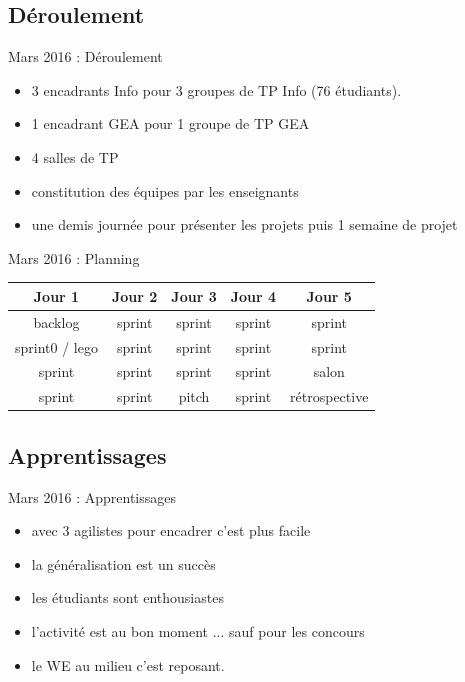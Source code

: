 \documentclass{beamer}
\begin{document}
\subsection{Déroulement}
\begin{frame}{Mars 2016 : Déroulement}
  \begin{itemize}
    \item 3 encadrants Info pour 3 groupes de TP Info (76 étudiants).
    \item 1 encadrant GEA pour 1 groupe de TP GEA
    \item 4 salles de TP
    \item constitution des équipes par les enseignants
    \item une demis journée pour présenter les projets puis 1 semaine de projet
  \end{itemize}
\end{frame}

\begin{frame}{Mars 2016 : Planning}
  \begin{center}
    \begin{tabular}{| c | c | c || c | c |}
      \hline
      \textbf{Jour 1} & \textbf{Jour 2} & \textbf{Jour 3} & \textbf{Jour 4} & \textbf{Jour 5} \\
      \hline \hline
      backlog         & sprint          & sprint          & sprint          & sprint          \\
      \hline
      sprint0 / lego  & sprint          & sprint          & sprint          & sprint          \\
      \hline \hline
      sprint          & sprint          & sprint          & sprint          & salon           \\
      \hline
      sprint          & sprint          & pitch           & sprint          & rétrospective   \\
      \hline
    \end{tabular}
  \end{center}
\end{frame}

\subsection{Apprentissages}
\begin{frame}{Mars 2016 : Apprentissages}
  \begin{itemize}
    \item avec 3 agilistes pour encadrer c'est plus facile
    \item la généralisation est un succès
    \item les étudiants sont enthousiastes
    \item l'activité est au bon moment ... sauf pour les concours
    \item le WE au milieu c'est reposant.
  \end{itemize}
\end{frame}
\end{document}
